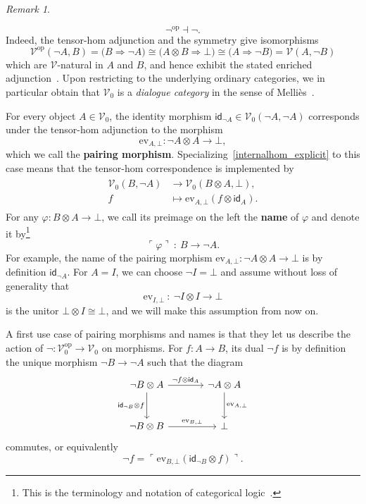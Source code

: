 \documentclass[11pt,onecolumn]{article}
\newcommand{\id}{\mathsf{id}}
\newcommand{\ev}{\mathrm{ev}}
\newcommand{\cV}{\mathscr{V}}
\newcommand{\op}{\mathrm{op}}
\newcommand{\name}[1]{\ulcorner #1 \urcorner}
\theoremstyle{plain}
\theoremstyle{remark}
\newtheorem{remark}[remark]{Remark}
\theoremstyle{definition}
\begin{document}
\begin{remark}
\begin{enumerate}
\begin{equation}
					\label{neg_enriched_adjunction}
					\neg^\op \dashv \neg.
				\end{equation}
				Indeed, the tensor-hom adjunction and the symmetry give isomorphisms
				\[
					\cV^\op(\neg A,B)
					=
					\bigl(B\Rightarrow\neg A\bigr)
					\cong
					\bigl(A\otimes B\Rightarrow\bot\bigr)
					\cong
					\bigl(A\Rightarrow\neg B\bigr)
					=
					\cV(A,\neg B)
				\]
				which are $\cV$-natural in $A$ and $B$, and hence exhibit the stated enriched adjunction~\cite[\S 1.11]{Kelly}.
				Upon restricting to the underlying ordinary categories, we in particular obtain that $\cV_0$ is a \emph{dialogue category} in the sense of Melli\`es~\cite[Section~4]{MelliesDialogue}.

			For every object $A \in \cV_0$, the identity morphism $\id_{\neg A} \in \cV_0(\neg A,\neg A)$ corresponds under the tensor-hom adjunction to the morphism
			\[
				\ev_{A,\bot} \colon \neg A \otimes A \to \bot,
			\]
			which we call the \textbf{pairing morphism}.
			Specializing~\eqref{internalhom_explicit} to this case means that the tensor-hom correspondence is implemented by
			\begin{align}
				\label{pairing_explicit}
				\begin{split}
					\cV_0(B,\neg A) & \longrightarrow \cV_0(B \otimes A,\bot), \\
					f & \longmapsto \ev_{A,\bot} (f \otimes \id_A).
				\end{split}
			\end{align}
			For any $\varphi : B \otimes A \to \bot$,
			we call its preimage on the left the \textbf{name} of $\varphi$ and denote it by\footnote{This is the terminology and notation of categorical logic~\cite[p.~165]{MacLaneMoerdijkSheaves}.}
			\[
				\name{\varphi} \: : \: B \longrightarrow \neg A.
			\]
			For example, the name of the pairing morphism $\ev_{A,\bot} : \neg A \otimes A \to \bot$ is by definition $\id_{\neg A}$.
			For $A = I$, we can choose $\neg I = \bot$ and assume without loss of generality that
			\begin{equation}
				\label{evI}
				\ev_{I,\bot} \: : \: \neg I \otimes I \longrightarrow \bot
			\end{equation}
			is the unitor $\bot \otimes I \cong \bot$, and we will make this assumption from now on.

			A first use case of pairing morphisms and names is that they let us describe the action of $\neg : \cV_0^\op \to \cV_0$ on morphisms.
			For $f : A \to B$, its dual $\neg f$ is by definition the unique morphism $\neg B \to \neg A$ such that the diagram
			\begin{equation}
				\label{negf}
				\begin{tikzcd}[column sep=large,row sep=large]
					\neg B \otimes A \ar[d, "\id_{\neg B} \otimes f"'] \ar[r, "\neg f \otimes \id_A"] & \neg A \otimes A \ar[d, "\ev_{A,\bot}"] \\
					\neg B \otimes B \ar[r, "\ev_{B,\bot}"] & \bot
				\end{tikzcd}
			\end{equation}
			commutes, or equivalently
			\[
				\neg f = \name{\ev_{B,\bot} (\id_{\neg B} \otimes f)}.
			\]


\end{enumerate}
\end{remark}
\end{document}
